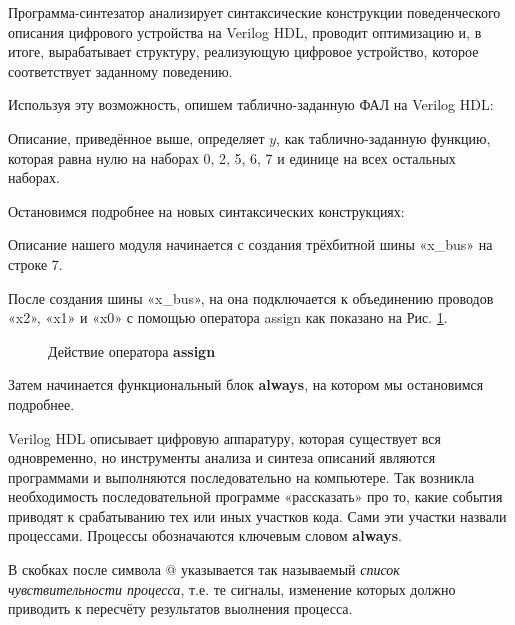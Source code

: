 \documentclass[a5paper, DIV=14, headings=openany, twoside=true,fontsize=10pt, titlepage]{scrreprt}
\newcommand{\quotes}[1]{«#1»}
\newcommand{\eng}[1]{\foreignlanguage{english}{#1}}
\newcommand{\qeng}[1]{\quotes{\eng{#1}}}
\newcommand{\kword}[1]{\eng{\textbf{#1}}}
\begin{document}
\par{Программа-синтезатор анализирует синтаксические конструкции поведенческого описания цифрового устройства на \eng{Verilog HDL}, проводит оптимизацию и, в итоге, вырабатывает структуру, реализующую цифровое устройство, которое соответствует заданному поведению.}

\par{Используя эту возможность, опишем таблично-заданную ФАЛ на \eng{Verilog HDL}:}



\par{Описание, приведённое выше, определяет $y$, как таблично-заданную функцию, которая равна нулю на наборах 0, 2, 5, 6, 7 и единице на всех остальных наборах.}

\par{Остановимся подробнее на новых синтаксических конструкциях:}
\par{Описание нашего модуля начинается с создания трёхбитной шины \qeng{x\_bus} на строке 7.}
\par{После создания шины \qeng{x\_bus}, на она подключается к объединению проводов \qeng{x2}, \qeng{x1} и \qeng{x0} с помощью оператора \eng{assign} как показано на Рис. \ref{fig:assign}.}

\begin{figure}[H]
  \centering
  \def\svgwidth{\columnwidth}
  
  \caption{Действие оператора \kword{assign}}
  \label{fig:assign}
\end{figure}

\par{Затем начинается функциональный блок \kword{always}, на котором мы остановимся подробнее.}
\par{\eng{Verilog HDL} описывает цифровую аппаратуру, которая существует вся одновременно, но инструменты анализа и синтеза описаний являются программами и выполняются последовательно на компьютере. Так возникла необходимость последовательной программе «рассказать» про то, какие события приводят к срабатыванию тех или иных участков кода. Сами эти участки назвали процессами. Процессы обозначаются ключевым словом \kword{always}.}

\par{В скобках после символа @ указывается так называемый \emph{список чувствительности процесса}, т.е. те сигналы, изменение которых должно приводить к пересчёту результатов выолнения процесса.}
\end{document}
